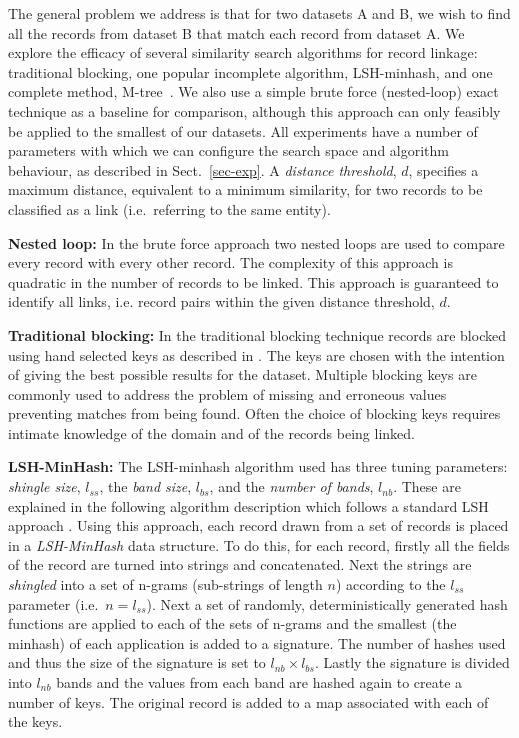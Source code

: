 \documentclass{llncs}
\begin{document}
The general problem we address is that for two datasets A and B, we wish
to find all the records from dataset B that match each record from dataset A.
We explore the efficacy of several similarity search algorithms for
record linkage: traditional blocking, one popular incomplete algorithm, LSH-minhash, and one complete
method, M-tree~\cite{paolociaccia2m}. We also use a simple brute force
(nested-loop) exact technique as a baseline for comparison, although
this approach can only feasibly be applied to the smallest of our
datasets. All experiments have a number of parameters with which we can
configure the search space and algorithm behaviour, as described in
Sect.~\ref{sec-exp}. A \emph{distance threshold}, $d$, specifies a
maximum distance, equivalent to a minimum similarity, for two records to
be classified as a link (i.e.\ referring to the same entity).

\smallskip
\textbf{Nested loop:}
In the brute force approach two nested loops are used to compare every 
record with every other record. The complexity of this 
approach is quadratic in the number of records to
be linked. This approach is guaranteed to identify all links, i.e. record pairs within the given distance threshold, $d$.

\smallskip
\textbf{Traditional  blocking:}
In the traditional blocking technique records are blocked using hand selected keys as described in \cite{Chr12b}. The keys are chosen with the intention of giving the best possible results for the dataset. Multiple blocking keys are commonly used to address the problem of missing and erroneous values preventing matches from being found. Often the choice of blocking keys requires intimate knowledge of the domain and of the records being linked.

\smallskip
\textbf{LSH-MinHash:}
The LSH-minhash algorithm used has three tuning parameters:
\emph{shingle size}, $l_{ss}$, the \emph{band size}, $l_{bs}$, and the
\emph{number of bands}, $l_{nb}$.
These are explained in the following algorithm description which follows a standard LSH approach \cite{Ind98}.
Using this approach, each record drawn from a set of records is placed in a \emph{LSH-MinHash} data structure.
To do this, for each record, firstly all the fields of the record are turned into strings and 
concatenated. Next the strings are \emph{shingled} into a set of
n-grams (sub-strings of length $n$) according to the $l_{ss}$
parameter (i.e.\ $n = l_{ss}$). Next a set of randomly, 
deterministically generated hash functions are applied to each of the
sets of n-grams and the smallest (the minhash) of each application is
added to a signature. The number of hashes used and thus the size of
the signature is set to $l_{nb} \times l_{bs}$.
Lastly the signature is divided into $l_{nb}$ bands and the values  from each band are hashed again to create a number of keys.
The original record is added to a map associated with each of the keys. 
\end{document}

